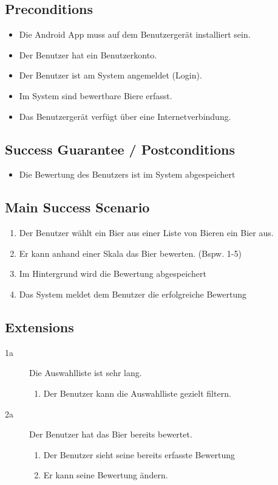 \documentclass[10pt,a4paper]{scrartcl}
\begin{document}
\subsection*{Preconditions}

\begin{itemize}
\item Die Android App muss auf dem Benutzergerät installiert sein.
\item Der Benutzer hat ein Benutzerkonto.
\item Der Benutzer ist am System angemeldet (Login).
\item Im System sind bewertbare Biere erfasst.
\item Das Benutzergerät verfügt über eine Internetverbindung.
\end{itemize}


\subsection*{Success Guarantee / Postconditions}
\begin{itemize}
\item Die Bewertung des Benutzers ist im System abgespeichert
\end{itemize}


\subsection*{Main Success Scenario}

\begin{enumerate}
\item Der Benutzer wählt ein Bier aus einer Liste von Bieren ein Bier aus.
\item Er kann anhand einer Skala das Bier bewerten. (Bspw. 1-5)
\item Im Hintergrund wird die Bewertung abgespeichert
\item Das System meldet dem Benutzer die erfolgreiche Bewertung
\end{enumerate}


\subsection*{Extensions}

\begin{description}
\item[1a] Die Auswahlliste ist sehr lang.
	\begin{enumerate}
	\item Der Benutzer kann die Auswahlliste gezielt filtern.
	\end{enumerate}
\item[2a] Der Benutzer hat das Bier bereits bewertet.
	\begin{enumerate}
	\item Der Benutzer sieht seine bereits erfasste Bewertung
	\item Er kann seine Bewertung ändern.
	\end{enumerate}

\end{description}
\end{document}
